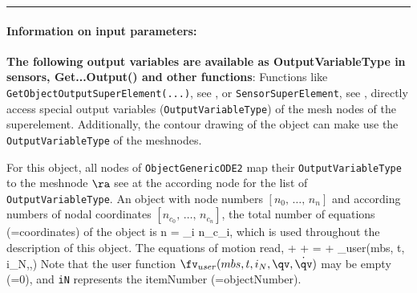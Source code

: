 \par\noindent\rule{\textwidth}{0.4pt}
\label{description_ObjectGenericODE2}
\paragraph{Information on input parameters:} 
\finishTable
{\bf The following output variables are available as OutputVariableType in sensors, Get...Output() and other functions}: 
\finishTable
 \noindent
    Functions like \texttt{GetObjectOutputSuperElement(...)}, see , 
    or \texttt{SensorSuperElement}, see , directly access special output variables
    (\texttt{OutputVariableType}) of the mesh nodes of the superelement.
    Additionally, the contour drawing of the object can make use the \texttt{OutputVariableType} of the meshnodes.

    For this object, all nodes of \texttt{ObjectGenericODE2} map their \texttt{OutputVariableType} to the meshnode $\ra$
    see at the according node for the list of \texttt{OutputVariableType}.
    An object with node numbers $[n_0,\,\ldots,\,n_n]$ and according numbers of nodal coordinates $[n_{c_0},\,\ldots,\,n_{c_n}]$, the total number of equations (=coordinates) of the object is
    \be
      n = \sum_{i} n_{c_i},
    \ee
    which is used throughout the description of this object.
    The equations of motion read,
    \be \label{eq_ObjectGenericODE2_EOM}
      \Mm \ddot \qv + \Dm \dot \qv + \Km \qv = \fv + \fv_{user}(mbs, t, i_N,\qv,\dot \qv)
    \ee
    Note that the user function $\fv_{user}(mbs, t, i_N,\qv,\dot \qv)$ may be empty (=0), and \texttt{iN} represents the itemNumber (=objectNumber). 
    
